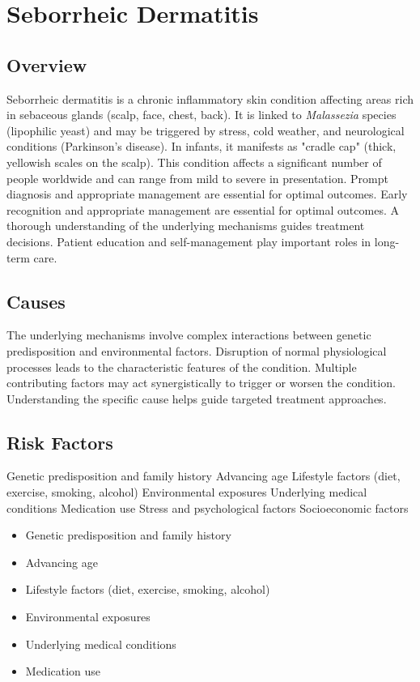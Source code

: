 \chapter{Seborrheic Dermatitis}
\label{sec:Seborrheic Dermatitis}

\section{Overview}
Seborrheic dermatitis is a chronic inflammatory skin condition affecting areas rich in sebaceous glands (scalp, face, chest, back). It is linked to \textit{Malassezia} species (lipophilic yeast) and may be triggered by stress, cold weather, and neurological conditions (Parkinson's disease). In infants, it manifests as "cradle cap" (thick, yellowish scales on the scalp). This condition affects a significant number of people worldwide and can range from mild to severe in presentation. Prompt diagnosis and appropriate management are essential for optimal outcomes. Early recognition and appropriate management are essential for optimal outcomes. A thorough understanding of the underlying mechanisms guides treatment decisions. Patient education and self-management play important roles in long-term care.
\section{Causes}
The underlying mechanisms involve complex interactions between genetic predisposition and environmental factors. Disruption of normal physiological processes leads to the characteristic features of the condition. Multiple contributing factors may act synergistically to trigger or worsen the condition. Understanding the specific cause helps guide targeted treatment approaches.
\section{Risk Factors}
Genetic predisposition and family history Advancing age Lifestyle factors (diet, exercise, smoking, alcohol) Environmental exposures Underlying medical conditions Medication use Stress and psychological factors Socioeconomic factors

\begin{itemize}[noitemsep]
  \item Genetic predisposition and family history
  \item Advancing age
  \item Lifestyle factors (diet, exercise, smoking, alcohol)
  \item Environmental exposures
  \item Underlying medical conditions
  \item Medication use
\end{itemize}
